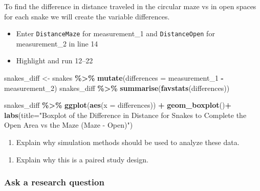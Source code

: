 \documentclass[
]{report}
\newenvironment{Shaded}{\begin{snugshade}}{\end{snugshade}}
\newcommand{\AttributeTok}[1]{\textcolor[rgb]{0.13,0.29,0.53}{#1}}
\newcommand{\FunctionTok}[1]{\textcolor[rgb]{0.13,0.29,0.53}{\textbf{#1}}}
\newcommand{\NormalTok}[1]{#1}
\newcommand{\OtherTok}[1]{\textcolor[rgb]{0.56,0.35,0.01}{#1}}
\newcommand{\SpecialCharTok}[1]{\textcolor[rgb]{0.81,0.36,0.00}{\textbf{#1}}}
\newcommand{\StringTok}[1]{\textcolor[rgb]{0.31,0.60,0.02}{#1}}
\providecommand{\tightlist}{%
  \setlength{\itemsep}{0pt}\setlength{\parskip}{0pt}}
\begin{document}
To find the difference in distance traveled in the circular maze vs in open spaces for each snake we will create the variable differences.

\begin{itemize}
\item
  Enter \texttt{DistanceMaze} for measurement\_1 and \texttt{DistanceOpen} for measurement\_2 in line 14
\item
  Highlight and run 12--22
\end{itemize}

\begin{Shaded}
\begin{Highlighting}[]
\NormalTok{snakes\_diff }\OtherTok{\textless{}{-}}\NormalTok{ snakes }\SpecialCharTok{\%\textgreater{}\%} 
  \FunctionTok{mutate}\NormalTok{(}\AttributeTok{differences =}\NormalTok{ measurement\_1 }\SpecialCharTok{{-}}\NormalTok{ measurement\_2)}
\NormalTok{snakes\_diff }\SpecialCharTok{\%\textgreater{}\%} 
    \FunctionTok{summarise}\NormalTok{(}\FunctionTok{favstats}\NormalTok{(differences))}

\NormalTok{snakes\_diff }\SpecialCharTok{\%\textgreater{}\%} 
    \FunctionTok{ggplot}\NormalTok{(}\FunctionTok{aes}\NormalTok{(}\AttributeTok{x =}\NormalTok{ differences)) }\SpecialCharTok{+}
    \FunctionTok{geom\_boxplot}\NormalTok{()}\SpecialCharTok{+}
    \FunctionTok{labs}\NormalTok{(}\AttributeTok{title=}\StringTok{"Boxplot of the Difference in Distance for Snakes to }
\StringTok{         Complete the Open Area vs the Maze }
\StringTok{         (Maze {-} Open)"}\NormalTok{)}
\end{Highlighting}
\end{Shaded}

\begin{enumerate}
\def\labelenumi{\arabic{enumi}.}
\tightlist
\item
  Explain why simulation methods should be used to analyze these data.
\end{enumerate}

\vspace{0.6in}

\begin{enumerate}
\def\labelenumi{\arabic{enumi}.}
\setcounter{enumi}{1}
\tightlist
\item
  Explain why this is a paired study design.
\end{enumerate}

\vspace{0.6in}

\subsubsection*{Ask a research question}\label{ask-a-research-question}
\end{document}
